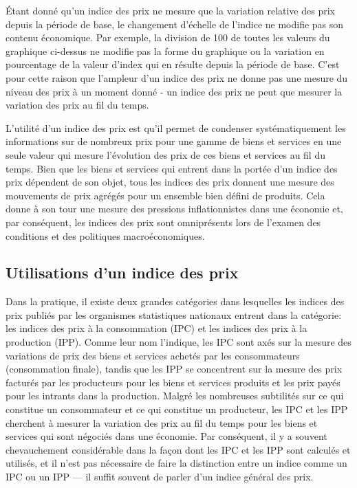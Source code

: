 \documentclass[
]{article}
\begin{document}
Étant donné qu'un indice des prix ne mesure que la variation relative des prix depuis la période de base, le changement d'échelle de l'indice ne modifie pas son contenu économique. Par exemple, la division de 100 de toutes les valeurs du graphique ci-dessus ne modifie pas la forme du graphique ou la variation en pourcentage de la valeur d'index qui en résulte depuis la période de base. C'est pour cette raison que l'ampleur d'un indice des prix ne donne pas une mesure du niveau des prix à un moment donné - un indice des prix ne peut que mesurer la variation des prix au fil du temps.

L'utilité d'un indice des prix est qu'il permet de condenser systématiquement les informations sur de nombreux prix pour une gamme de biens et services en une seule valeur qui mesure l'évolution des prix de ces biens et services au fil du temps. Bien que les biens et services qui entrent dans la portée d'un indice des prix dépendent de son objet, tous les indices des prix donnent une mesure des mouvements de prix agrégés pour un ensemble bien défini de produits. Cela donne à son tour une mesure des pressions inflationnistes dans une économie et, par conséquent, les indices des prix sont omniprésents lors de l'examen des conditions et des politiques macroéconomiques.

\hypertarget{utilisations-dun-indice-des-prix}{%
\subsection{Utilisations d'un indice des prix}\label{utilisations-dun-indice-des-prix}}

Dans la pratique, il existe deux grandes catégories dans lesquelles les indices des prix publiés par les organismes statistiques nationaux entrent dans la catégorie: les indices des prix à la consommation (IPC) et les indices des prix à la production (IPP). Comme leur nom l'indique, les IPC sont axés sur la mesure des variations de prix des biens et services achetés par les consommateurs (consommation finale), tandis que les IPP se concentrent sur la mesure des prix facturés par les producteurs pour les biens et services produits et les prix payés pour les intrants dans la production. Malgré les nombreuses subtilités sur ce qui constitue un consommateur et ce qui constitue un producteur, les IPC et les IPP cherchent à mesurer la variation des prix au fil du temps pour les biens et services qui sont négociés dans une économie. Par conséquent, il y a souvent
chevauchement considérable dans la façon dont les IPC et les IPP sont calculés et utilisés, et il n'est pas nécessaire de faire la distinction entre un indice comme un IPC ou un IPP --- il suffit souvent de parler d'un indice général des prix.
\end{document}
